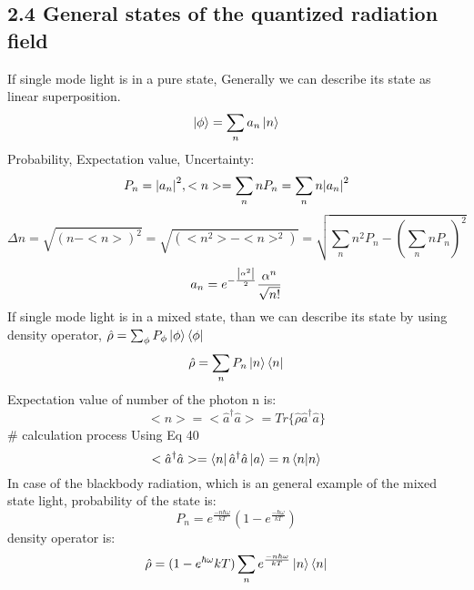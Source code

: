 \documentclass[9pt]{article}
\begin{document}
\subsection{2.4 General states of the quantized radiation field}
If single mode light is in a pure state, Generally we can describe its state as linear superposition.
\begin{equation}
    \ket{\phi}=\sum_n a_n\ket{n}
\end{equation}
Probability, Expectation value, Uncertainty:
\begin{equation*}
    P_n=\abs{a_n}^2 , <n>=\sum_n nP_n = \sum_n n\abs{a_n}^2
\end{equation*}
\begin{equation}
    \Delta{n}=\sqrt{(n-<n>)^2} = \sqrt{(<n^2>-<n>^2)}= \sqrt{\sum_n n^2 P_n-(\sum_n nP_n)^2}
\end{equation}
\begin{equation}
    a_n=e^{-\frac{\abs{\alpha^2}}{2}}\frac{\alpha^n}{\sqrt{n!}}
\end{equation}
If single mode light is in a mixed state, than we can describe its state by using density operator, $\hat{\rho}=\sum_\phi P_\phi \ket{\phi}\bra{\phi}$
\begin{equation}
    \hat{\rho}=\sum_n P_n \ket{n}\bra{n}
\end{equation}
Expectation value of number of the photon n is:
\begin{equation}
    <n>=<\hat{a}^\dagger\hat{a}>=Tr\{ \hat{\rho}\hat{a}^\dagger\hat{a}\}
\end{equation}
\# calculation process Using Eq 40
\begin{equation*}
    <\hat{a}^\dagger\hat{a}>=\bra{n}\hat{a}^\dagger\hat{a}\ket{a}=n\braket{n}{n}
\end{equation*}
In case of the blackbody radiation, which is an general example of the mixed state light,  probability of the state is:
\begin{equation}
    P_n=e^{\frac{-n\hbar\omega}{kT}}(1-e^{\frac{-\hbar\omega}{kT}})
\end{equation}
density operator is:
\begin{equation}
    \hat{\rho}=(1-e^{\hbar\omega}{kT})\sum_n e^{\frac{-n\hbar\omega}{kT}}\ket{n}\bra{n}
\end{equation}
\end{document}

